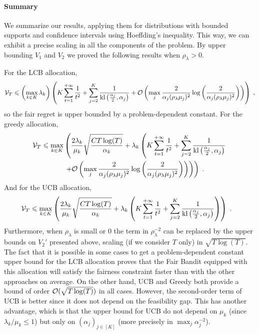 \paragraph{Summary} We summarize our results, applying them for distributions with bounded supports and confidence intervals using Hoeffding's inequality. This way, we can exhibit a precise scaling in all the components of the problem. By upper bounding $V_1$ and $V_2$ we proved the following results when $\rho_\lambda>0$. 

For the LCB allocation,
	\[\mathcal{V}_T \leqslant \left(\max_{k \in K}\lambda_k\right) \left( K \sum_{t=1}^{+\infty} \frac{1}{t^2} + \sum_{j=2}^K\frac{1}{\text{\normalfont kl}\left(\frac{\alpha_j}{2}, \alpha_j\right)} + \mathcal{O}\left(\max_j\frac{2}{\alpha_j(\rho_\lambda \mu_j)^2}\log\left(\frac{2}{\alpha_j(\rho_\lambda \mu_j)^2}\right)\right)\right) \;, \]
so the fair regret is upper bounded by a problem-dependent constant. For the greedy allocation, 
	\begin{align*} \mathcal{V}_T \leqslant \max_{k\in K} &\left(\frac{2\lambda_k}{\mu_k}\sqrt{\frac{C T \log(T)}{\alpha_k}}+ \lambda_k\left(K \sum_{t=1}^{+\infty} \frac{1}{t^2} + \sum_{j=2}^K\frac{1}{\text{\normalfont kl}\left(\frac{\alpha_j}{2}, \alpha_j\right)} \right.\right. \\
	& \left.\left. + \mathcal{O}\left(\max_j\frac{2}{\alpha_j(\rho_\lambda \mu_j)^2}\log\left(\frac{2}{\alpha_j(\rho_\lambda \mu_j)^2}\right)\right)\right)\right) \;. \end{align*}
And for the UCB allocation, 
		\begin{align*} \mathcal{V}_T \leqslant \max_{k\in K} &\left(\frac{2\lambda_k}{\mu_k}\sqrt{\frac{C T \log(T)}{\alpha_k}}+ \lambda_k\left(K \sum_{t=1}^{+\infty} \frac{1}{t^2} + \sum_{j=2}^K\frac{1}{\text{\normalfont kl}\left(\frac{\alpha_j}{2}, \alpha_j\right)}\right)\right) \;. \end{align*}
Furthermore, when $\rho_\lambda$ is small or $0$ the term in $\rho_\lambda^{-2}$ can be replaced by the upper bounds on $V_2'$ presented above, scaling (if we consider $T$ only) in $\sqrt{T\log(T)}$. The fact that it is possible in some cases to get a problem-dependent constant upper bound for the LCB allocation proves that the Fair Bandit equipped with this allocation will satisfy the fairness constraint faster than with the other approaches on average. On the other hand, UCB and Greedy both provide a bound of order $\mathcal{O}(\sqrt{T\log(T)})$ in all cases. However, the second-order term of UCB is better since it does not depend on the feasibility gap. This has another advantage, which is that the upper bound for UCB do not depend on $\mu_k$ (since $\lambda_k/\mu_k \leq 1$) but only on $(\alpha_j)_{j \in [K]}$ (more precisely in $\max_j \alpha_j^{-2}$).

